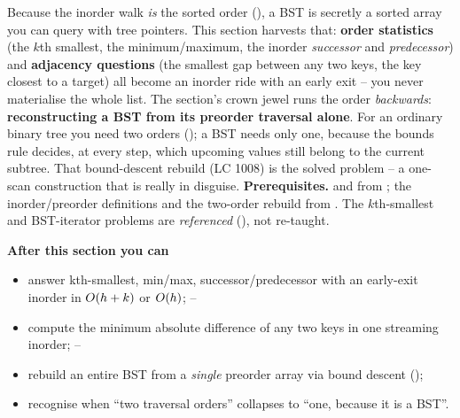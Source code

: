 \begin{topicintro}
Because the inorder walk \emph{is} the sorted order (), a BST is secretly a
sorted array you can query with tree pointers. This section harvests that: \textbf{order statistics}
(the $k$th smallest, the minimum/maximum, the inorder \emph{successor} and \emph{predecessor}) and
\textbf{adjacency questions} (the smallest gap between any two keys, the key closest to a target) all
become an inorder ride with an early exit -- you never materialise the whole list. The section's
crown jewel runs the order \emph{backwards}: \textbf{reconstructing a BST from its preorder traversal
alone}. For an ordinary binary tree you need two orders (); a BST needs
only one, because the bounds rule decides, at every step, which upcoming values still belong to the
current subtree. That bound-descent rebuild (LC 1008) is the solved problem -- a one-scan
construction that is really  in disguise.
\textbf{Prerequisites.}  and  from ; the
inorder/preorder definitions and the two-order rebuild from . The $k$th-smallest and
BST-iterator problems are \emph{referenced} (), not re-taught.

\textbf{After this section you can}
\begin{itemize}[nosep]
  \item answer kth-smallest, min/max, successor/predecessor with an early-exit inorder in $O(h+k)$ or $O(h)$; \hfill{}--
  \item compute the minimum absolute difference of any two keys in one streaming inorder; \hfill{}--
  \item rebuild an entire BST from a \emph{single} preorder array via bound descent (); \hfill{}
  \item recognise when ``two traversal orders'' collapses to ``one, because it is a BST''. \hfill{}
\end{itemize}
\end{topicintro}

